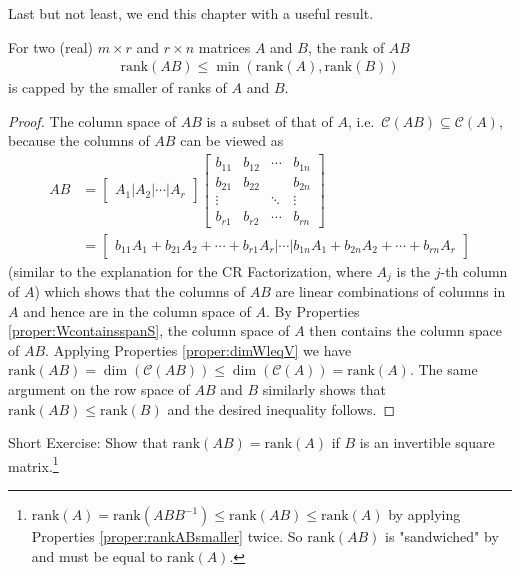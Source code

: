Last but not least, we end this chapter with a useful result.
\begin{proper}
\label{proper:rankABsmaller}
For two (real) $m \times r$ and $r \times n$ matrices $A$ and $B$, the rank of $AB$
\begin{align*}
\text{rank}(AB) \leq \min(\text{rank}(A),\text{rank}(B))
\end{align*}
is capped by the smaller of ranks of $A$ and $B$.
\end{proper}
\begin{proof}
The column space of $AB$ is a subset of that of $A$, i.e.\ $\mathcal{C}(AB) \subseteq \mathcal{C}(A)$, because the columns of $AB$ can be viewed as
\begin{align*}
AB &= \begin{bmatrix}
A_1|A_2|\cdots|A_r
\end{bmatrix}
\begin{bmatrix}
b_{11} & b_{12} & \cdots & b_{1n} \\
b_{21} & b_{22} & & b_{2n} \\
\vdots & & \ddots & \vdots \\
b_{r1} & b_{r2} & \cdots & b_{rn}
\end{bmatrix} \\
&= \begin{bmatrix}
b_{11}A_1 + b_{21}A_2 + \cdots + b_{r1}A_r|\cdots|b_{1n}A_1 + b_{2n}A_2 + \cdots + b_{rn}A_r
\end{bmatrix}
\end{align*}
(similar to the explanation for the CR Factorization, where $A_j$ is the $j$-th column of $A$) which shows that the columns of $AB$ are linear combinations of columns in $A$ and hence are in the column space of $A$. By Properties \ref{proper:WcontainsspanS}, the column space of $A$ then contains the column space of $AB$. Applying Properties \ref{proper:dimWleqV} we have $\text{rank}(AB) = \dim(\mathcal{C}(AB)) \leq \dim(\mathcal{C}(A)) = \text{rank}(A)$. The same argument on the row space of $AB$ and $B$ similarly shows that $\text{rank}(AB) \leq \text{rank}(B)$ and the desired inequality follows.
\end{proof}
Short Exercise: Show that $\text{rank}(AB) = \text{rank}(A)$ if $B$ is an invertible square matrix.\footnote{$\text{rank}(A) = \text{rank}(ABB^{-1}) \leq \text{rank}(AB) \leq \text{rank}(A)$ by applying Properties \ref{proper:rankABsmaller} twice. So $\text{rank}(AB)$ is "sandwiched" by and must be equal to $\text{rank}(A)$.}

